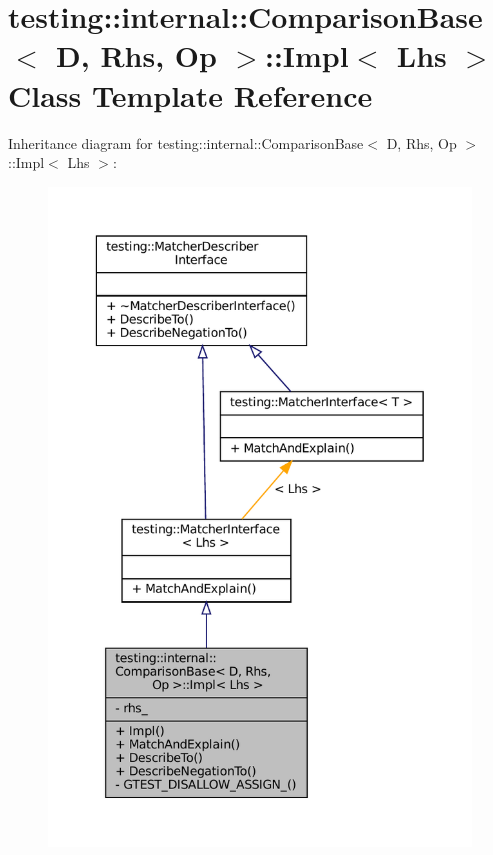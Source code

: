 \hypertarget{classtesting_1_1internal_1_1ComparisonBase_1_1Impl}{}\section{testing\+:\+:internal\+:\+:Comparison\+Base$<$ D, Rhs, Op $>$\+:\+:Impl$<$ Lhs $>$ Class Template Reference}
\label{classtesting_1_1internal_1_1ComparisonBase_1_1Impl}


Inheritance diagram for testing\+:\+:internal\+:\+:Comparison\+Base$<$ D, Rhs, Op $>$\+:\+:Impl$<$ Lhs $>$\+:
\nopagebreak
\begin{figure}[H]
\begin{center}
\leavevmode
\includegraphics[width=349pt]{classtesting_1_1internal_1_1ComparisonBase_1_1Impl__inherit__graph}
\end{center}
\end{figure}


